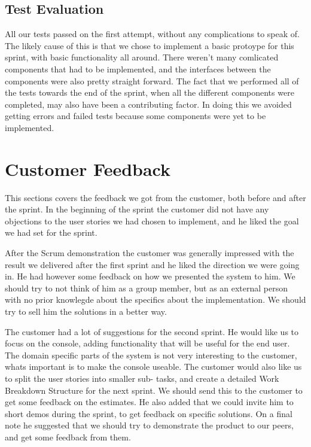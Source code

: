 \subsection{Test Evaluation}
All our tests passed on the first attempt, without any complications to speak of. The likely cause of this is that we chose to implement a basic protoype for this sprint, with basic functionality all around. There weren't many comlicated components that had to be implemented, and the interfaces between the components were also pretty straight forward. The fact that we performed all of the tests towards the end of the sprint, when all the different components were completed, may also have been a contributing factor. In doing this we avoided getting errors and failed tests because some components were yet to be implemented.

\section{Customer Feedback}
This sections covers the feedback we got from the customer, both before and after the sprint.
\newline
\newline
In the beginning of the sprint the customer did not have any objections to the user stories we had chosen to implement, and he liked the goal we had set for the sprint.

After the Scrum demonstration the customer was generally impressed with the result we delivered after the first sprint and he liked the direction we were going in. He had however some feedback on how we presented the system to him. We should try to not think of him as a group member, but as an external person with no prior knowlegde about the specifics about the implementation. We should try to sell him the solutions in a better way.

The customer had a lot of suggestions for the second sprint. He would like us to focus on the console, adding functionality that will be useful for the end user. The domain specific parts of the system is not very interesting to the customer, whats important is to make the console useable. The customer would also like us to split the user stories into smaller sub- tasks, and create a detailed Work Breakdown Structure for the next sprint. We should send this to the customer to get some feedback on the estimates. He also added that we could invite him to short demos during the sprint, to get feedback on specific solutions. On a final note he suggested that we should try to demonstrate the product to our peers, and get some feedback from them.


